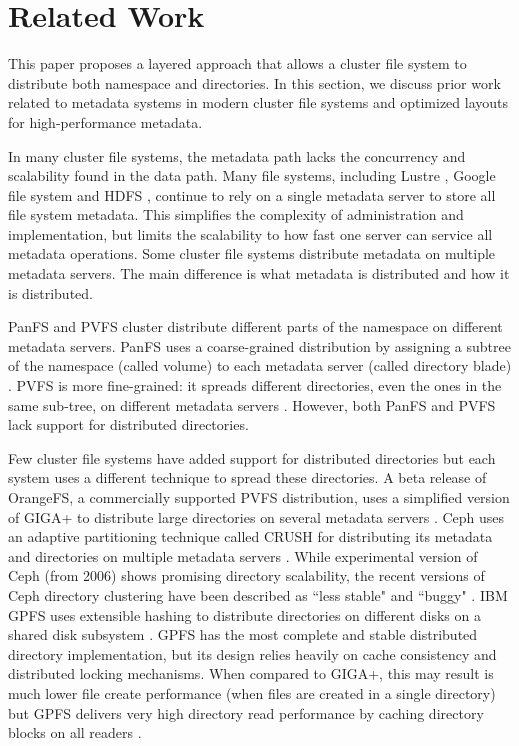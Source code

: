 \section{Related Work}
\label{relatedwork}

This paper proposes a layered approach that allows a cluster file system to 
distribute both namespace and directories. In this section, we discuss prior
work related to metadata systems in modern cluster file systems and optimized
layouts for high-performance metadata.

In many cluster file systems, the metadata path lacks the concurrency and 
scalability found in the data path.
Many file systems, including Lustre \cite{lustre}, Google file system
\cite{gfs:ghemawat03} and HDFS \cite{HDFS}, continue to rely on a single
metadata server to store all file system metadata. This simplifies the
complexity of administration and implementation, but limits the scalability to 
how fast one server can service all metadata operations. 
Some cluster file systems distribute metadata on multiple metadata servers. The 
main difference is what metadata is distributed and how it is distributed.

PanFS and PVFS cluster distribute different parts of the namespace on different
metadata servers.
PanFS uses a coarse-grained distribution by assigning a subtree of the
namespace (called volume) to each metadata server (called directory blade) 
\cite{panfs:welch08}.
PVFS is more fine-grained: it spreads different directories, even the ones in
the same sub-tree, on different metadata servers \cite{pvfs}.
However, both PanFS and PVFS lack support for distributed directories.

Few cluster file systems have added support for distributed directories but
each system uses a different technique to spread these directories.
A beta release of OrangeFS, a commercially supported PVFS distribution, uses a 
simplified version of GIGA+ to distribute large directories on several metadata 
servers \cite{OrangeFS}.
Ceph uses an adaptive partitioning technique called CRUSH for distributing its
metadata and directories on multiple metadata servers \cite{ceph:weil06}. While
experimental version of Ceph (from 2006) shows promising directory scalability,
the recent versions of Ceph directory clustering have been described as
``less stable" \cite{ceph-baddirs1:www} and ``buggy" \cite{ceph-baddirs2:www}.
IBM GPFS uses extensible hashing to distribute directories on different disks on 
a shared disk subsystem \cite{gpfs:schmuck02}. GPFS has the most complete and
stable distributed directory implementation, but its design relies heavily on
cache consistency and distributed locking mechanisms. When compared to GIGA+,
this may result is much lower file create performance (when files are created
in a single directory) but GPFS delivers very high directory read performance 
by caching directory blocks on all readers \cite{GIGA11}.


